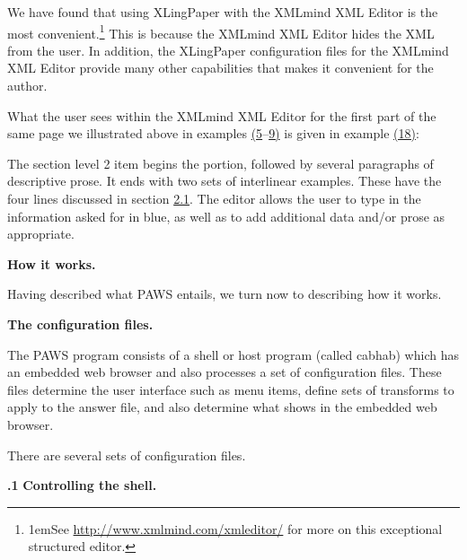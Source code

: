 \documentclass[12pt]{article}
\begin{document}
We have found that using {XLingPaper} with the {XMLmind XML Editor} is the most convenient.\protect\footnote[8]{{\parindent1em\protect\hypertarget{nXXE}{}See \href{http://www.xmlmind.com/xmleditor/}{http://www.xmlmind.com/xmleditor/} for more on this exceptional structured editor.}} This is because the {XMLmind XML Editor} hides the XML from the user. In addition, the {XLingPaper} configuration files for the {XMLmind XML Editor} provide many other capabilities that makes it convenient for the author.\par{}\indent What the user sees within the {XMLmind XML Editor} for the first part of the same page we illustrated above in examples \hyperlink{xPossesors1}{(5}–\hyperlink{xPossessors3}{9)} is given in example \hyperlink{xXXE1}{(18)}:\par{}{\vspace{12pt}\raggedright{}
\vspace{12pt}}\noindent The section level 2 item begins the portion, followed by several paragraphs of descriptive prose. It ends with two sets of interlinear examples. These have the four lines discussed in section \hyperlink{sPracticalStructure}{2.1}. The editor allows the user to type in the information asked for in blue, as well as to add additional data and/or prose as appropriate.\par{}\vspace{.25in}\noindent\protect\hypertarget{sComp}{{\noindent
\textbf{{ }}}}{\noindent
\textbf{{\protect\noindent
How it works. }}}
Having described what {PAWS} entails, we turn now to describing how it works.\par{}\vspace{.25in}\noindent\protect\hypertarget{sConfig}{{\noindent
\textbf{{ }}}}{\noindent
\textbf{{\protect\noindent
The configuration files. }}}
The {PAWS} program consists of a shell or host program (called {cabhab}) which has an embedded web browser and also processes a set of configuration files. These files determine the user interface such as menu items, define sets of transforms to apply to the answer file, and also determine what shows in the embedded web browser.\par{}\indent There are several sets of configuration files.\par{}\vspace{.25in}\noindent\protect\hypertarget{sConfigCabhab}{{\noindent
\textbf{{.1 }}}}{\noindent
\textbf{{\protect\noindent
Controlling the shell. }}}
\end{document}
